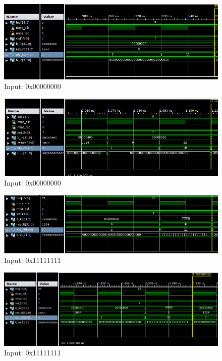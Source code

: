 \documentclass[a4paper, 10pt]{article}
\begin{document}
        \begin{figure}[H]
            \includegraphics[scale=0.5]{../images/clo_2.png}
            \caption{Input: 0x00000000}
        \end{figure}
        \begin{figure}[H]
            \includegraphics[scale=0.5]{../images/clz_2.png}
            \caption{Input: 0x00000000}
        \end{figure}

        \begin{figure}[H]
            \includegraphics[scale=0.5]{../images/clo_3.png}
            \caption{Input: 0x11111111}
        \end{figure}
        \begin{figure}[H]
            \includegraphics[scale=0.5]{../images/clz_3.png}
            \caption{Input: 0x11111111}
        \end{figure}
\end{document}
